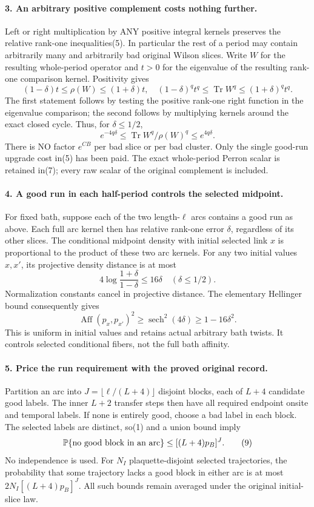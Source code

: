 \documentclass[11pt]{article}
\begin{document}
\paragraph{3. An arbitrary positive complement costs nothing further.}
Left or right multiplication by ANY positive integral kernels preserves the
relative rank-one inequalities(5). In particular the rest of a period may
contain arbitrarily many and arbitrarily bad original Wilson slices. Write
$W$ for the resulting whole-period operator and $t>0$ for the eigenvalue of
the resulting rank-one comparison kernel. Positivity gives
\[
 (1-\delta)t\le\rho(W)\le(1+\delta)t,
\quad
 (1-\delta)^q t^q\le\operatorname{Tr}W^q\le(1+\delta)^q t^q.             \tag{6}
\]
The first statement follows by testing the positive rank-one right function
in the eigenvalue comparison; the second follows by multiplying kernels
around the exact closed cycle. Thus, for $\delta\le1/2$,
\[
 e^{-4q\delta}\le\operatorname{Tr}W^q/\rho(W)^q\le e^{4q\delta}.          \tag{7}
\]
There is NO factor $e^{CB}$ per bad slice or per bad cluster. Only the single
good-run upgrade cost in(5) has been paid. The exact whole-period Perron scalar
is retained in(7); every raw scalar of the original complement is included.

\paragraph{4. A good run in each half-period controls the selected midpoint.}
For fixed bath, suppose each of the two length-$\ell$ arcs contains a good
run as above. Each full arc kernel then has relative rank-one error $\delta$,
regardless of its other slices. The conditional midpoint density with initial
selected link $x$ is proportional to the product of these two arc kernels.
For any two initial values $x,x'$, its projective density distance is at most
\[
 4\log\frac{1+\delta}{1-\delta}\le16\delta\quad(\delta\le1/2).
\]
Normalization constants cancel in projective distance. The elementary
Hellinger bound consequently gives
\[
 \operatorname{Aff}(p_x,p_{x'})^2\ge\operatorname{sech}^2(4\delta)
                  \ge1-16\delta^2.                                   \tag{8}
\]
This is uniform in initial values and retains actual arbitrary bath twists.
It controls selected conditional fibers, not the full bath affinity.

\paragraph{5. Price the run requirement with the proved original record.}
Partition an arc into $J=\lfloor\ell/(L+4)\rfloor$ disjoint blocks, each of
$L+4$ candidate good labels. The inner $L+2$ transfer steps then have all
required endpoint onsite and temporal labels. If none is entirely good, choose a bad label in
each block. The selected labels are distinct, so(1) and a union bound imply
\[
 \mathbb P\{\hbox{no good block in an arc}\}
       \le[(L+4)p_B]^J.                                                \tag{9}
\]
No independence is used. For $N_I$ plaquette-disjoint selected trajectories,
the probability that some trajectory lacks a good block in either arc is at
most $2N_I[(L+4)p_B]^J$. All such bounds remain averaged under the original initial-slice law.
\end{document}

